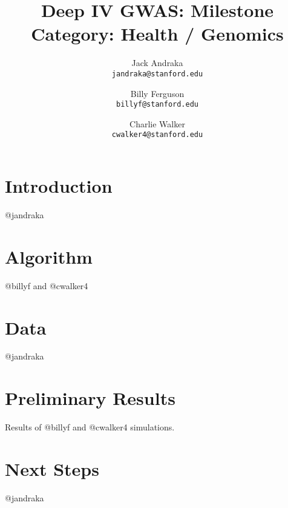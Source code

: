 \documentclass[11pt, oneside]{article}   	%
\title{Deep IV GWAS: Milestone \\
	\large Category: Health / Genomics}
\author{
	Jack Andraka\\ 
	\texttt{jandraka@stanford.edu}
	\and
	Billy Ferguson\\
	\texttt{billyf@stanford.edu}
	\and
	Charlie Walker\\
	\texttt{cwalker4@stanford.edu}
}
\date{}							%
\begin{document}
\maketitle
\section{Introduction}
@jandraka 

\section{Algorithm}
@billyf and @cwalker4

\section{Data}
@jandraka

\section{Preliminary Results}
Results of @billyf and @cwalker4 simulations.

\section{Next Steps}
@jandraka 
\end{document}
